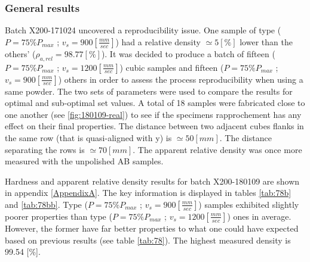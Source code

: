 \subsubsection{General results}
Batch X200-171024 uncovered a reproducibility issue. One sample of type ($P=75\% P_{max}$ ; $v_s=900 [\frac{mm}{sec}]$) had a relative density $\simeq 5 [\%]$ lower than the others' ($\rho_{a,rel}=98.77[\%]$). It was decided to produce a batch of fifteen ($P=75\% P_{max}$ ; $v_s=1200 [\frac{mm}{sec}]$) cubic samples and fifteen ($P=75\% P_{max}$ ; $v_s=900 [\frac{mm}{sec}]$) others in order to assess the process reproducibility when using a same powder. The two sets of parameters were used to compare the results for optimal and sub-optimal set values. A total of 18 samples were fabricated close to one another (see \ref{fig:180109-real}) to see if the specimens rapprochement has any effect on their final properties. The distance between two adjacent cubes flanks in the same row (that is quasi-aligned with y) is $\simeq 50 [mm]$. The distance separating the rows is $\simeq 70 [mm]$. The apparent relative density was once more measured with the unpolished AB samples.\\

 \begin{center}
\begin{table}[ht]
\noindent{}

\caption[Standard deviations and average values for apparent relative densities and hardnesses of the specimens of batch X200-171024]{Standard deviations and average values for apparent relative densities and hardnesses of the specimens of batch X200-171024}
\label{tab:78}
\end{table}
 \end{center}

Hardness and apparent relative density results for batch X200-180109 are shown in appendix \ref{AppendixA}. The key information is displayed in tables \ref{tab:78b} and \ref{tab:78bb}. Type ($P=75\% P_{max}$ ; $v_s=900 [\frac{mm}{sec}]$) samples exhibited slightly poorer properties than type ($P=75\% P_{max}$ ; $v_s=1200 [\frac{mm}{sec}]$) ones in average. However, the former have far better properties to what one could have expected based on previous results (see table \ref{tab:78}). The highest measured density is 99.54 [\%].\\

